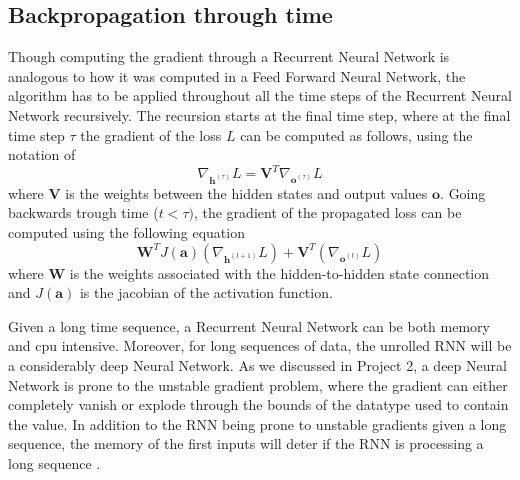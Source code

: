 \documentclass
[twocolumn,
secnumarabic,
nobibnotes,
aps,
prl,
reprint,
groupedaddress,
amsmath,
amssymb,
]{revtex4-2}
\begin{document}
\subsection{Backpropagation through time}
Though computing the gradient through a Recurrent Neural Network is analogous to how it was computed in a Feed Forward Neural Network, the algorithm has to be applied throughout all the time steps of the Recurrent Neural Network recursively. The recursion starts at the final time step, where at the final time step $\tau$ the gradient of the loss $L$ can be computed as follows, using the notation of \cite{Goodfellow2016}
\begin{equation}
  \nabla_{\bm{h}^{(\tau)}}L = \bm{V}^T \nabla_{\bm{o}^{(\tau)}}L
\end{equation}
where $\bm{V}$ is the weights between the hidden states and output values $\bm{o}$.
Going backwards trough time ($t < \tau)$, the gradient of the propagated loss can be computed using the following equation
\begin{equation}
  \bm{W}^TJ(\bm{a})(\nabla_{\bm{h}^{(t+1)}}L)+\bm{V}^T(\nabla_{\bm{o}^{(t)}}L)
\end{equation}
where $\bm{W}$ is the weights associated with the hidden-to-hidden state connection and $J(\bm{a})$ is the jacobian of the activation function.%


Given a long time sequence, a Recurrent Neural Network can be both memory and cpu intensive. Moreover, for long sequences of data, the unrolled RNN will be a considerably deep Neural Network. As we discussed in Project 2, a deep Neural Network is prone to the unstable gradient problem, where the gradient can either completely vanish or explode through the bounds of the datatype used to contain the value. In addition to the RNN being prone to unstable gradients given a long sequence, the memory of the first inputs will deter if the RNN is processing a long sequence \cite{Geron2019}.
\end{document}
